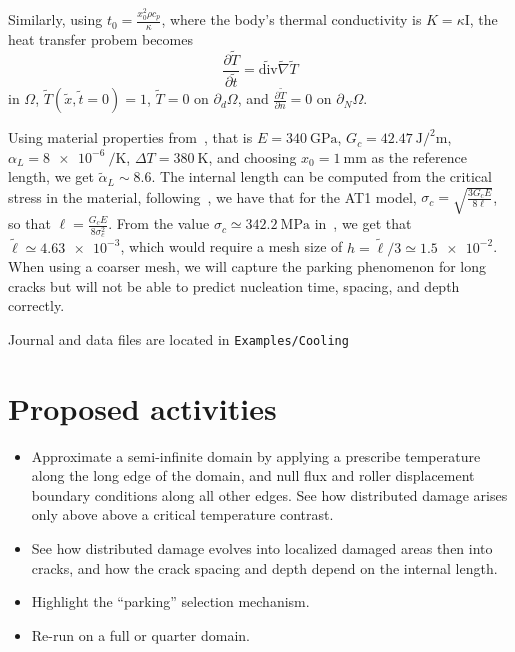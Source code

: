\documentclass[10pt,oneside]{memoir}
\begin{document}
Similarly, using $t_0 = \frac{x_0^2\rho c_p}{\kappa}$, where the body's thermal conductivity is $K =\kappa \mathrm{I}$, the heat transfer probem becomes
$$
	\frac{\partial \tilde{T}}{\partial \tilde t} = \tilde{\mathrm{div}} \tilde{\nabla} \tilde{T}
$$ in $\Omega$, $\tilde{T}(\tilde{x},\tilde{t}=0) = 1$, $\tilde{T} = 0$ on $\partial_d\Omega$, and $\frac{\partial \tilde{T}}{\partial n} = 0$ on $\partial_N \Omega$.



Using material properties from~\cite{Bourdin-Marigo-EtAl-2014a}, that is $E=\SI{340}{\giga\pascal}$, $G_c = \SI{42.47}{\joule\per\squared\meter}$, $\alpha_L = \SI{8e-6}{\per\kelvin}$, $\Delta T = \SI{380}{\kelvin}$, and choosing $x_0=\SI{1}{\milli\meter}$ as the reference length, we get $\tilde{\alpha}_L \sim 8.6$. 
The internal length can be computed from the critical stress in the material, following~\cite{Pham-Marigo-EtAl-2011a}, we have that for the AT1 model, $\sigma_c = \sqrt{\frac{3G_cE}{8\ell}}$, so that $\ell = \frac{G_cE}{8\sigma_c^2}$. From the value $\sigma_c \simeq \SI{342.2}{\mega\pascal}$ in~\cite{Bourdin-Marigo-EtAl-2014a}, we get that $\tilde{\ell} \simeq \num{4.63e-3}$, which would require  a mesh size of $h = \tilde{\ell}/3 \simeq \num{1.5e-2}$.
When using a coarser mesh, we will capture the parking phenomenon for long cracks but will not be able to predict nucleation time, spacing, and depth correctly.


Journal and data files are located in  \verb+Examples/Cooling+

\section*{Proposed activities}
\begin{itemize}
\item Approximate a semi-infinite domain by applying a prescribe temperature along the long edge of the domain, and null flux and roller displacement boundary conditions along all other edges. See how distributed damage arises only above above a critical temperature contrast.
\item See how distributed damage evolves into localized damaged areas then into cracks, and how the crack spacing and depth depend on the internal length.
\item Highlight the ``parking'' selection mechanism.
\item Re-run on a full or quarter domain.
\end{itemize}
\end{document}
